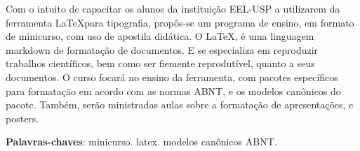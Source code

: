 \documentclass[
	12pt,				%
	openright,			%
	oneside,			%
	a4paper,			%
	english,			%
	french,				%
	spanish,			%
	brazil,				%
	]{abntex2}
\begin{document}

\frenchspacing


\imprimircapa






\setlength{\absparsep}{18pt} %
\begin{resumo}
Com o intuito de capacitar os alunos da instituição EEL-USP a
utilizarem da ferramenta \LaTeX para tipografia, propôs-se um programa
de ensino, em formato de minicurso, com uso de apostila didática. O
\LaTeX, é uma linguagem markdown de formatação de documentos. E se especializa em reproduzir trabalhos científicos, bem
como ser fiemente reprodutível, quanto a seus documentos. O curso focará no
ensino da ferramenta, com pacotes específicos para formatação em
acordo com as normas ABNT, e os modelos canônicos do pacote. Também,
serão ministradas aulas sobre a formatação de apresentações, e posters.

 \noindent
 \textbf{Palavras-chaves}: minicurso. latex. modelos canônicos ABNT.
\end{resumo}


\tableofcontents*
\end{document}
